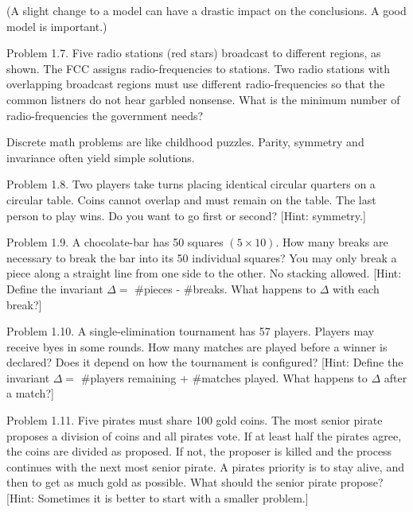 \documentclass[10pt]{article}
\begin{document}
(A slight change to a model can have a drastic impact on the conclusions. A good model is important.)

Problem 1.7. Five radio stations (red stars) broadcast to different regions, as shown. The FCC assigns radio-frequencies to stations. Two radio stations with overlapping broadcast regions must use different radio-frequencies so that the common listners do not hear garbled nonsense. What is the minimum number of radio-frequencies the government needs?

Discrete math problems are like childhood puzzles. Parity, symmetry and invariance often yield simple solutions.


Problem 1.8. Two players take turns placing identical circular quarters on a circular table. Coins cannot overlap and must remain on the table. The last person to play wins. Do you want to go first or second? [Hint: symmetry.]

Problem 1.9. A chocolate-bar has 50 squares $(5 \times 10)$. How many breaks are necessary to break the bar into its 50 individual squares? You may only break a piece along a straight line from one side to the other. No stacking allowed. [Hint: Define the invariant $\Delta=$ \#pieces - \#breaks. What happens to $\Delta$ with each break?]


Problem 1.10. A single-elimination tournament has 57 players. Players may receive byes in some rounds. How many matches are played before a winner is declared? Does it depend on how the tournament is configured? [Hint: Define the invariant $\Delta=$ \#players remaining + \#matches played. What happens to $\Delta$ after a match?]

Problem 1.11. Five pirates must share 100 gold coins. The most senior pirate proposes a division of coins and all pirates vote. If at least half the pirates agree, the coins are divided as proposed. If not, the proposer is killed and the process continues with the next most senior pirate. A pirates priority is to stay alive, and then to get as much gold as possible. What should the senior pirate propose? [Hint: Sometimes it is better to start with a smaller problem.]
\end{document}
